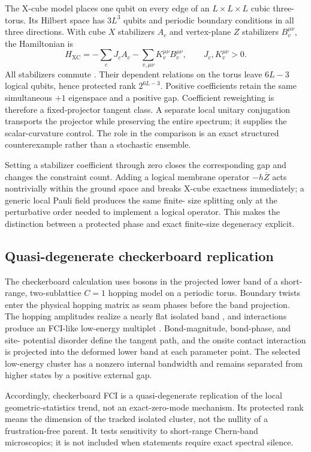 The X-cube model places one qubit on every edge of an $L\times L\times L$
cubic three-torus.  Its Hilbert space has $3L^3$ qubits and periodic boundary
conditions in all three directions.  With cube $X$ stabilizers $A_c$ and
vertex-plane $Z$ stabilizers $B_v^{\mu\nu}$, the Hamiltonian is
\begin{equation}
 H_{\mathrm{XC}}=-\sum_c J_cA_c
 -\sum_{v,\mu\nu}K_v^{\mu\nu}B_v^{\mu\nu},
 \qquad J_c,K_v^{\mu\nu}>0.
 \label{eq:xcube-parent}
\end{equation}
All stabilizers commute \cite{vijay2016xcube}.  Their dependent relations on
the torus leave $6L-3$ logical qubits, hence protected rank $2^{6L-3}$.
Positive coefficients retain the same simultaneous $+1$ eigenspace and a
positive gap.  Coefficient reweighting is therefore a fixed-projector tangent
class.  A separate local unitary conjugation transports the projector while
preserving the entire spectrum; it supplies the scalar-curvature control.
The role in the comparison is an exact structured counterexample rather than
a stochastic ensemble.

Setting a stabilizer coefficient through zero closes the corresponding gap
and changes the constraint count.  Adding a logical membrane operator
$-h\overline Z$ acts nontrivially within the ground space and breaks X-cube
exactness immediately; a generic local Pauli field produces the same finite-
size splitting only at the perturbative order needed to implement a logical
operator.  This makes the distinction between a protected phase and exact
finite-size degeneracy explicit.

\subsection{Quasi-degenerate checkerboard replication}

The checkerboard calculation uses bosons in the projected lower band of a
short-range, two-sublattice $C=1$ hopping model on a periodic torus.  Boundary
twists enter the physical hopping matrix as seam phases before the band
projection.  The hopping amplitudes realize a nearly flat isolated band
\cite{sun:2011:flat}, and interactions produce an FCI-like low-energy
multiplet \cite{regnault:2011:fci}.  Bond-magnitude, bond-phase, and site-
potential disorder define the tangent path, and the onsite contact interaction
is projected into the deformed lower band at each parameter point.  The
selected low-energy cluster
has a nonzero internal bandwidth and remains separated from higher states by
a positive external gap.

Accordingly, checkerboard FCI is a quasi-degenerate replication of the local
geometric-statistics trend, not an exact-zero-mode mechanism.  Its protected
rank means the dimension of the tracked isolated cluster, not the nullity of a
frustration-free parent.  It tests sensitivity to short-range Chern-band
microscopics; it is not included when statements require exact spectral
silence.


